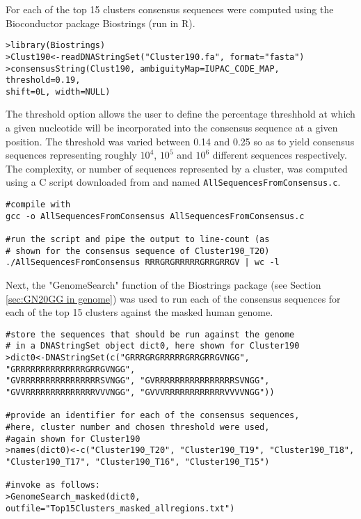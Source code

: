 For each of the top 15 clusters consensus sequences were computed using the Bioconductor package Biostrings (run in R).

\begin{lstlisting}
>library(Biostrings)
>Clust190<-readDNAStringSet("Cluster190.fa", format="fasta") 
>consensusString(Clust190, ambiguityMap=IUPAC_CODE_MAP, threshold=0.19,
shift=0L, width=NULL) 
\end{lstlisting}

The threshold option allows the user to define the percentage threshhold at which a given nucleotide will be incorporated into the consensus sequence at a given position. The threshold was varied between 0.14 and 0.25 so as to yield consensus sequences representing roughly $10^4$, $10^5$ and $10^6$ different sequences respectively. The complexity, or number of sequences represented by a cluster, was computed using a C script downloaded from \cite{Lindenbaum:Online} and named \verb|AllSequencesFromConsensus.c|.

\begin{lstlisting}
#compile with
gcc -o AllSequencesFromConsensus AllSequencesFromConsensus.c

#run the script and pipe the output to line-count (as 
# shown for the consensus sequence of Cluster190_T20)
./AllSequencesFromConsensus RRRGRGRRRRRGRRGRRGV | wc -l
\end{lstlisting}

Next, the "GenomeSearch" function of the Biostrings package (see Section \ref{sec:GN20GG in genome}) was used to run each of the consensus sequences for each of the top 15 clusters against the masked human genome. 

\begin{lstlisting}
#store the sequences that should be run against the genome
# in a DNAStringSet object dict0, here shown for Cluster190
>dict0<-DNAStringSet(c("GRRRGRGRRRRRGRRGRRGVNGG", "GRRRRRRRRRRRRRRGRRGVNGG",
"GVRRRRRRRRRRRRRRRRSVNGG", "GVRRRRRRRRRRRRRRRRSVNGG",
"GVVRRRRRRRRRRRRRRVVVNGG", "GVVVRRRRRRRRRRRRVVVVNGG"))

#provide an identifier for each of the consensus sequences,
#here, cluster number and chosen threshold were used, 
#again shown for Cluster190 
>names(dict0)<-c("Cluster190_T20", "Cluster190_T19", "Cluster190_T18", "Cluster190_T17", "Cluster190_T16", "Cluster190_T15")

#invoke as follows:
>GenomeSearch_masked(dict0, outfile="Top15Clusters_masked_allregions.txt")
\end{lstlisting}

